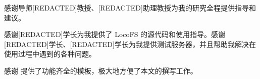 
\begin{acknowledgements}
  感谢导师[REDACTED]教授、[REDACTED]助理教授为我的研究全程提供指导和建议。

  感谢[REDACTED]学长为我提供了 LocoFS 的源代码和使用指导。感谢[REDACTED]学长、[REDACTED]学长为我提供测试服务器，并且帮助我解决在使用过程中遇到的各种问题。

  感谢 \thuthesis\cite{thuthesis} 提供了功能齐全的模板，极大地方便了本文的撰写工作。
\end{acknowledgements}
